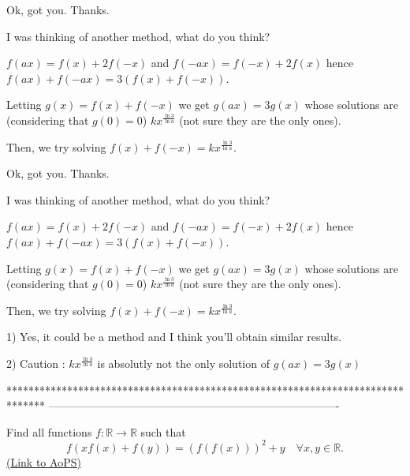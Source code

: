 \begin{mysolution}
	Ok, got you. Thanks.

I was thinking of another method, what do you think?

$f(ax)=f(x)+2f(-x)$ and $f(-ax)=f(-x)+2f(x)$ hence $f(ax)+f(-ax)=3(f(x)+f(-x))$.

Letting $g(x)=f(x)+f(-x)$ we get $g(ax)=3g(x)$ whose solutions are (considering that $g(0)=0$) $kx^{\frac{\ln{3}}{\ln{a}}}$ (not sure they are the only ones).

Then, we try solving $f(x)+f(-x)=kx^{\frac{\ln{3}}{\ln{a}}}$.
\end{mysolution}



\begin{mysolution}
	\begin{tcolorbox}Ok, got you. Thanks.

I was thinking of another method, what do you think?

$f(ax)=f(x)+2f(-x)$ and $f(-ax)=f(-x)+2f(x)$ hence $f(ax)+f(-ax)=3(f(x)+f(-x))$.

Letting $g(x)=f(x)+f(-x)$ we get $g(ax)=3g(x)$ whose solutions are (considering that $g(0)=0$) $kx^{\frac{\ln{3}}{\ln{a}}}$ (not sure they are the only ones).

Then, we try solving $f(x)+f(-x)=kx^{\frac{\ln{3}}{\ln{a}}}$.\end{tcolorbox}

1) Yes, it could be a method and I think you'll obtain similar results.

2) Caution : $kx^{\frac{\ln{3}}{\ln{a}}}$ is absolutly not the only solution of $g(ax)=3g(x)$
\end{mysolution}
*******************************************************************************
-------------------------------------------------------------------------------

\begin{problem}
	Find all functions $f: \mathbb{R}\rightarrow\mathbb{R}$ such that
\[f\left(xf(x)+f(y)\right)=\left(f(f(x))\right)^{2}+y \quad \forall x,y \in \mathbb R.\]
	\flushright \href{https://artofproblemsolving.com/community/c6h154349}{(Link to AoPS)}
\end{problem}



